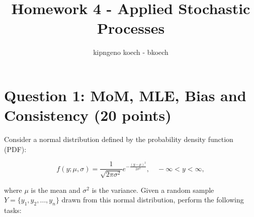 \documentclass{article}
\begin{document}
\author{kipngeno koech - bkoech}
\title{Homework 4 - Applied Stochastic Processes}   
\maketitle

\medskip

\section*{Question 1: MoM, MLE, Bias and Consistency (20 points)}

Consider a normal distribution defined by the probability density function (PDF):

\[
f(y; \mu, \sigma) = \frac{1}{\sqrt{2\pi\sigma^2}} e^{-\frac{(y - \mu)^2}{2\sigma^2}}, \quad -\infty < y < \infty,
\]

\noindent where \(\mu\) is the mean and \(\sigma^2\) is the variance. Given a random sample \(Y = \{ y_1, y_2, \ldots, y_n \}\) drawn from this normal distribution, perform the following tasks:
\end{document}
